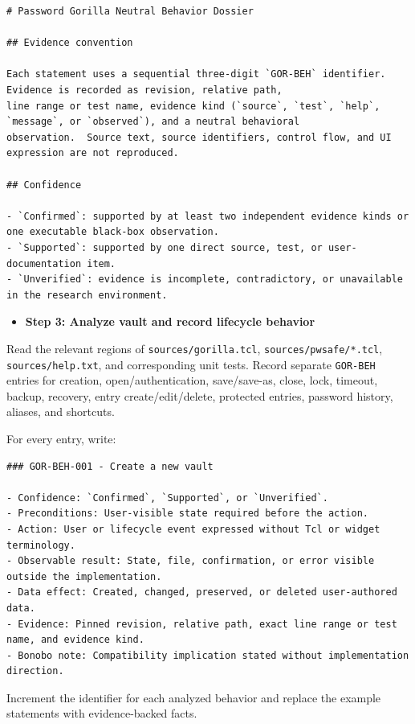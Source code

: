 \documentclass[
  letterpaper,
]{article}
\newcommand{\passthrough}[1]{#1}
\providecommand{\tightlist}{%
  \setlength{\itemsep}{0pt}\setlength{\parskip}{0pt}}
\begin{document}
\begin{lstlisting}
# Password Gorilla Neutral Behavior Dossier

## Evidence convention

Each statement uses a sequential three-digit `GOR-BEH` identifier.  Evidence is recorded as revision, relative path,
line range or test name, evidence kind (`source`, `test`, `help`, `message`, or `observed`), and a neutral behavioral
observation.  Source text, source identifiers, control flow, and UI expression are not reproduced.

## Confidence

- `Confirmed`: supported by at least two independent evidence kinds or one executable black-box observation.
- `Supported`: supported by one direct source, test, or user-documentation item.
- `Unverified`: evidence is incomplete, contradictory, or unavailable in the research environment.
\end{lstlisting}

\begin{itemize}
\tightlist
\item[$\boxtimes$]
  \textbf{Step 3: Analyze vault and record lifecycle behavior}
\end{itemize}

Read the relevant regions of \nolinkurl{sources/gorilla.tcl}, \nolinkurl{sources/pwsafe/*.tcl},
\nolinkurl{sources/help.txt}, and corresponding unit tests. Record separate \passthrough{\lstinline!GOR-BEH!} entries
for creation, open/authentication, save/save-as, close, lock, timeout, backup, recovery, entry create/edit/delete,
protected entries, password history, aliases, and shortcuts.

For every entry, write:

\begin{lstlisting}
### GOR-BEH-001 - Create a new vault

- Confidence: `Confirmed`, `Supported`, or `Unverified`.
- Preconditions: User-visible state required before the action.
- Action: User or lifecycle event expressed without Tcl or widget terminology.
- Observable result: State, file, confirmation, or error visible outside the implementation.
- Data effect: Created, changed, preserved, or deleted user-authored data.
- Evidence: Pinned revision, relative path, exact line range or test name, and evidence kind.
- Bonobo note: Compatibility implication stated without implementation direction.
\end{lstlisting}

Increment the identifier for each analyzed behavior and replace the example statements with evidence-backed facts.
\end{document}
